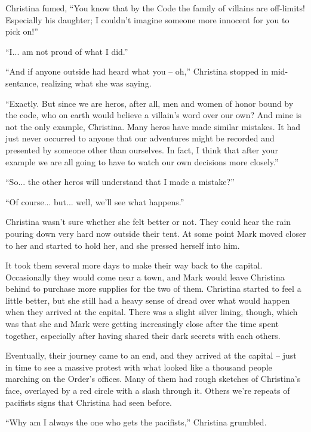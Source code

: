 \documentclass[showtrims,b6paper,draft,10pt]{memoir}
\begin{document}
Christina fumed, ``You know that by the Code the family of villains are off-limits!  Especially his daughter;  I couldn't imagine someone more innocent for you to pick on!''

``I... am not proud of what I did.''

``And if anyone outside had heard what you -- oh,'' Christina stopped in mid-sentance, realizing what she was saying.

``Exactly.  But since we are heros, after all, men and women of honor bound by the code, who on earth would believe a villain's word over our own?  And mine is not the only example, Christina.  Many heros have made similar mistakes.  It had just never occurred to anyone that our adventures might be recorded and presented by someone other than ourselves.  In fact, I think that after your example we are all going to have to watch our own decisions more closely.''

``So... the other heros will understand that I made a mistake?''

``Of course... but... well, we'll see what happens.''

Christina wasn't sure whether she felt better or not.  They could hear the rain pouring down very hard now outside their tent.  At some point Mark moved closer to her and started to hold her, and she pressed herself into him.

\timeskip
It took them several more days to make their way back to the capital.  Occasionally they would come near a town, and Mark would leave Christina behind to purchase more supplies for the two of them.  Christina started to feel a little better, but she still had a heavy sense of dread over what would happen when they arrived at the capital.  There was a slight silver lining, though, which was that she and Mark were getting increasingly close after the time spent together, especially after having shared their dark secrets with each others.

Eventually, their journey came to an end, and they arrived at the capital -- just in time to see a massive protest with what looked like a thousand people marching on the Order's offices.  Many of them had rough sketches of Christina's face, overlayed by a red circle with a slash through it.  Others we're repeats of pacifists signs that Christina had seen before.

``Why am I always the one who gets the pacifists,'' Christina grumbled.
\end{document}
